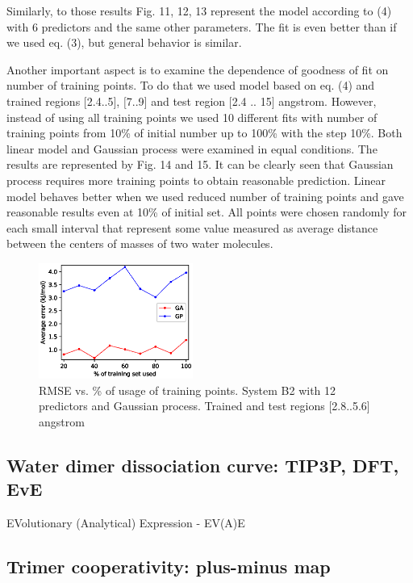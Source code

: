 \documentclass[aip,jcp,reprint,amsmath,amssymb,nature]{revtex4-1}
\begin{document}
Similarly, to those results Fig. 11, 12, 13 represent the model 
according to (4) with 6 predictors and the same other parameters. The 
fit is even better than if we used eq. (3), but general behavior is 
similar.




Another important aspect is to examine the dependence of goodness of fit 
on number of training points. To do that we used model based on eq. (4) 
and trained regions $[$2.4..5$]$, $[$7..9$]$ and test region $[$2.4 .. 
15$]$ angstrom. However, instead of using all training points we used 10 
different fits with number of training points from 10\% of initial 
number up to 100\% with the step 10\%. Both linear model and Gaussian 
process were examined in equal conditions. The results are represented 
by Fig. 14 and 15. It can be clearly seen that Gaussian process requires 
more training points to obtain reasonable prediction. Linear model 
behaves better when we used reduced number of training points and gave 
reasonable results even at 10\% of initial set. All points were chosen 
randomly for each small interval that represent some value measured as 
average distance between the centers of masses of two water molecules. 

\begin{figure}[h]
\centering
\includegraphics[width=0.45\textwidth]{media/B2_12_predictors_RMSE_vs_percentage_of_training_set_used.eps}
\caption{RMSE vs. \% of usage of training points. System B2 with 12 predictors and Gaussian process. Trained and test regions [2.8..5.6] angstrom}
\label{Fig:B2_fractions}
\end{figure}


\subsection{Water dimer dissociation curve: TIP3P, DFT, EvE}

EVolutionary (Analytical) Expression - EV(A)E

\subsection{Trimer cooperativity: plus-minus map}
\end{document}
